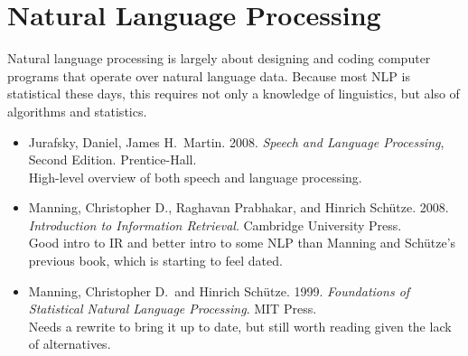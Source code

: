 \section{Natural Language Processing}

\noindent
Natural language processing is largely about designing and coding computer
programs that operate over natural language data.  Because most NLP is
statistical these days, this requires not only a knowledge of linguistics,
but also of algorithms and statistics.

\begin{itemize}
\item
Jurafsky, Daniel, James H.\ Martin.
2008.
{\it Speech and Language Processing}, Second Edition.
Prentice-Hall.
\\
{\footnotesize High-level overview of both speech and language
processing.}
%
\item
Manning, Christopher D., Raghavan Prabhakar, and Hinrich Sch\"utze.
2008.
{\it Introduction to Information Retrieval}.
Cambridge University Press.
\\
{\footnotesize Good intro to IR and better intro to some NLP than
Manning and Sch\"utze's previous book, which is starting to feel
dated.}
%
\item
Manning, Christopher D.\ and Hinrich Sch\"utze.
1999.
{\it Foundations of Statistical Natural Language Processing}.
MIT Press.
\\
{\footnotesize Needs a rewrite to bring it up to date, but still
worth reading given the lack of alternatives.}
\end{itemize}

